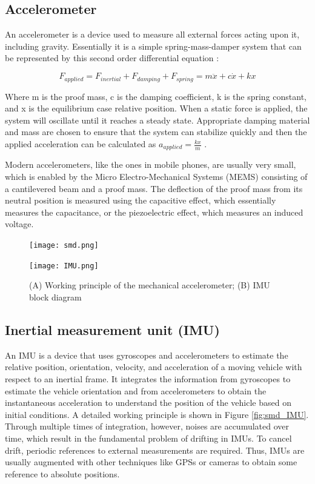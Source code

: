 \subsection{Accelerometer}
An accelerometer is a device used to measure all external forces acting upon it, including gravity. Essentially it is a simple spring-mass-damper system that can be represented by this second order differential equation \cite{dudek2008inertial}:

$$F_{applied} = F_{inertial} + F_{damping} + F_{spring} = m \ddot{x} + c \dot{x} + k x$$

Where m is the proof mass, c is the damping coefficient, k is the spring constant, and x is the equilibrium case relative position. When a static force is applied, the system will oscillate until it reaches a steady state. Appropriate damping material and mass are chosen to ensure that the system can stabilize quickly and then the applied acceleration can be calculated as $a_{applied} = \frac{kx}{m}$ .

Modern accelerometers, like the ones in mobile phones, are usually very small, which is enabled by the Micro Electro-Mechanical Systems (MEMS) consisting of a cantilevered beam and a proof mass. The deflection of the proof mass from its neutral position is measured using the capacitive effect, which essentially measures the capacitance, or the piezoelectric effect, which measures an induced voltage.

\begin{figure}[H]
  \centering
  \begin{minipage}[b]{0.15\textwidth}
    \texttt{[image: smd.png]}
    \label{(a)}
  \end{minipage}
  \hfill
  \begin{minipage}[b]{0.7\textwidth}
    \texttt{[image: IMU.png]}
    \label{(b)}
  \end{minipage}
\caption{(A) Working principle of the mechanical accelerometer; (B) IMU block diagram \cite{dudek2008inertial}}
\end{figure}

\subsection{Inertial measurement unit (IMU)}



An IMU is a device that uses gyroscopes and accelerometers to estimate the relative position, orientation, velocity, and acceleration of a moving vehicle with respect to an inertial frame. It integrates the information from gyroscopes to estimate the vehicle orientation and from accelerometers to obtain the instantaneous acceleration to understand the position of the vehicle based on initial conditions. A detailed working principle is shown in Figure \ref{fig:smd_IMU}. Through multiple times of integration, however, noises are accumulated over time, which result in the fundamental problem of drifting in IMUs. To cancel drift, periodic references to external measurements are required. Thus, IMUs are usually augmented with other techniques like GPSs or cameras to obtain some reference to absolute positions.

